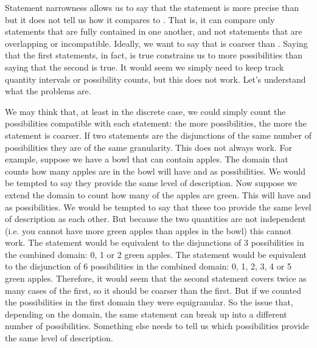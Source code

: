 \documentclass[11pt,letterpaper,fleqn]{memoir} %
\begin{document}
Statement narrowness allows us to say that the statement  is more precise than  but it does not tell us how it compares to . That is, it can compare only statements that are fully contained in one another, and not statements that are overlapping or incompatible. Ideally, we want to say that  is coarser than . Saying that the first statements, in fact, is true constrains us to more possibilities than saying that the second is true. It would seem we simply need to keep track quantity intervals or possibility counts, but this does not work. Let's understand what the problems are.

We may think that, at least in the discrete case, we could simply count the possibilities compatible with each statement: the more possibilities, the more the statement is coarser. If two statements are the disjunctions of the same number of possibilities they are of the same granularity. This does not always work. For example, suppose we have a bowl that can contain apples. The domain that counts how many apples are in the bowl will have  and  as possibilities. We would be tempted to say they provide the same level of description. Now suppose we extend the domain to count how many of the apples are green. This will have  and  as possibilities. We would be tempted to say that these too provide the same level of description as each other. But because the two quantities are not independent (i.e. you cannot have more green apples than apples in the bowl) this cannot work. The statement  would be equivalent to the disjunctions of 3 possibilities in the combined domain: 0, 1 or 2 green apples. The statement  would be equivalent to the disjunction of 6 possibilities in the combined domain: 0, 1, 2, 3, 4 or 5 green apples. Therefore, it would seem that the second statement covers twice as many cases of the first, so it should be coarser than the first. But if we counted the possibilities in the first domain they were equigranular. So the issue that, depending on the domain, the same statement can break up into a different number of possibilities. Something else needs to tell us which possibilities provide the same level of description.
\end{document}
